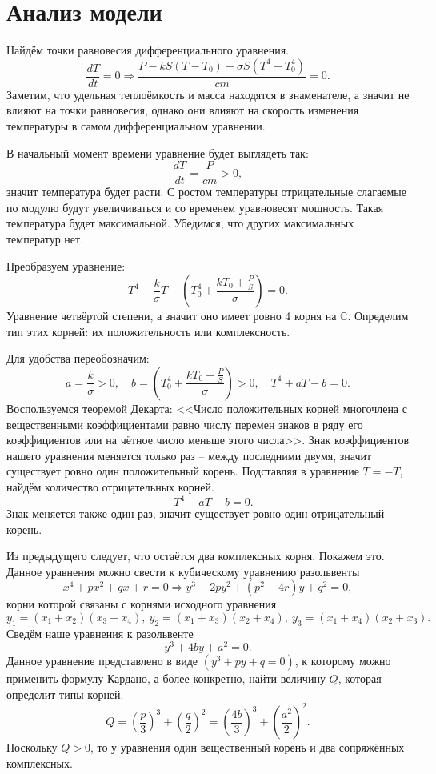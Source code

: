 \section{Анализ модели}
    Найдём точки равновесия дифференциального уравнения.
    \[
        \frac{dT}{dt} = 0 \Rightarrow  \frac{P - k S (T - T_0) - \sigma S (T^4 - T_0^4)}{cm} = 0.
    \]
    Заметим, что удельная теплоёмкость и масса находятся в знаменателе, а значит не влияют на точки равновесия, однако они влияют на скорость изменения температуры в самом дифференциальном уравнении. 

    В начальный момент времени уравнение будет выглядеть так:
    \[
        \frac{dT}{dt} = \frac{P}{cm} > 0,    
    \]
    значит температура будет расти. С ростом температуры отрицательные слагаемые по модулю будут увеличиваться и со временем уравновесят мощность. Такая температура будет максимальной. Убедимся, что других максимальных температур нет.
    
    Преобразуем уравнение:
    \[
        T^4 + \frac{k}{\sigma} T - \left( T_0^4 + \frac{k T_0 + \frac{P}{S}}{\sigma} \right) = 0.
    \]
    Уравнение четвёртой степени, а значит оно имеет ровно 4 корня на \(\mathbb{C}\). Определим тип этих корней: их положительность или комплексность.
    
    Для удобства переобозначим: 
    \[
            a = \frac{k}{\sigma} > 0, \quad b = \left( T_0^4 + \frac{k T_0 + \frac{P}{S}}{\sigma} \right) > 0, \quad T^4 + a T - b = 0.
    \]
    Воспользуемся теоремой Декарта: <<Число положительных корней многочлена с вещественными коэффициентами равно числу перемен знаков в ряду его коэффициентов или на чётное число меньше этого числа>>. Знак коэффициентов нашего уравнения меняется только раз -- между последними двумя, значит существует ровно один положительный корень. Подставляя в уравнение $ T = -T $, найдём количество отрицательных корней. 
    \[ \quad T^4 - a T - b = 0. \]
    Знак меняется также один раз, значит существует ровно один отрицательный корень.

    Из предыдущего следует, что остаётся два комплексных корня. Покажем это. Данное уравнения можно свести к кубическому уравнению разольвенты
    \[
        x^4 + px^2 + qx + r = 0 \Rightarrow y^3 -2py^2 + (p^2 - 4r)y + q^2 = 0,
    \]
    корни которой связаны с корнями исходного уравнения
    \[
        y_1 = (x_1 + x_2)(x_3+x_4), ~ y_2 = (x_1 + x_3)(x_2+x_4), ~ y_3 = (x_1 + x_4)(x_2+x_3).
    \]
    Сведём наше уравнения к разольвенте
    \[
        y^3 + 4by + a^2 = 0.
    \]
    Данное уравнение представлено в виде $(y^3 + py + q = 0)$, к которому можно применить формулу Кардано, а более конкретно, найти величину $ Q $, которая определит типы корней.
    \[
        Q = \left( \frac{p}{3} \right)^3 + \left( \frac{q}{2} \right)^2 = \left( \frac{4b}{3} \right)^3 + \left( \frac{a^2}{2} \right)^2.
    \]
    Поскольку $Q > 0$, то у уравнения один вещественный корень и два сопряжённых комплексных. 


